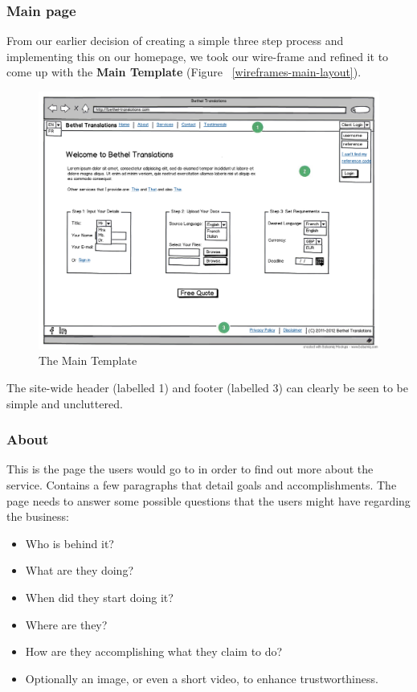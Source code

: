 \documentclass{l3proj}
\begin{document}
\subsubsection{Main page}
From our earlier decision of creating a simple three step process and
implementing this on our homepage, we took our wire-frame and refined it to
come up with the  \textbf{Main Template} (Figure ~\ref{wireframes-main-layout}).

\begin{figure}[ht]
\label{wireframes:main-template}
\begin{center}
\includegraphics[width=\linewidth]{wireframes/bt-homepagev3}
\caption{The Main Template}
\end{center}
\end{figure}

The site-wide header (labelled 1) and footer (labelled 3) can clearly be seen to
be simple and uncluttered.


\subsubsection{About}
This is the page the users would go to in order to find out more about the
service. Contains a few paragraphs that detail goals and accomplishments.
The page needs to answer some possible questions that the users might have
regarding the business:
\begin{itemize}
	\item Who is behind it?
	\item What are they doing?
	\item When did they start doing it?
	\item Where are they?
	\item How are they accomplishing what they claim to do?
	\item Optionally an image, or even a short video, to enhance trustworthiness.
\end{itemize}
\end{document}
